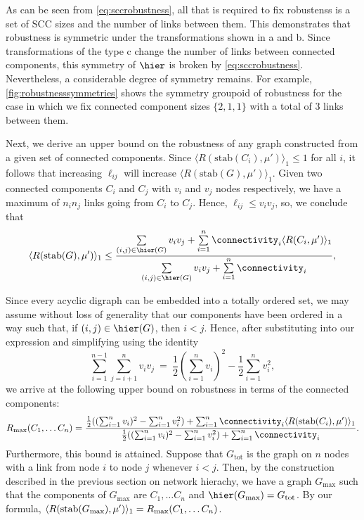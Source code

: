 As can be seen from \ref{eq:sccrobustness}, all that is required to fix robustenss is a set of SCC sizes and the number of links between them. This demonstrates that robustness is symmetric under the transformations shown in  a and b. Since transformations of the type  c change the number of links between connected components, this symmetry of $\hier$ is broken by \ref{eq:sccrobustness}. Nevertheless, a considerable degree of symmetry remains. For example, \ref{fig:robustnesssymmetries} shows the symmetry groupoid of robustness for the case in which we fix connected component sizes $\{2,1,1\}$ with a total of $3$ links between them.

Next, we derive an upper bound on the robustness of any graph
constructed from a given set of connected components.  Since
$\langle R(\textrm{stab}(C_i), \mu') \rangle_1 \le 1$ for all $i$, it follows that increasing $\ell_{ij}$ will
increase $\langle R(\textrm{stab}(G),\mu') \rangle_1$.  Given two connected components $C_i$ and $C_j$ with
$v_i$ and $v_j$ nodes respectively, we have a maximum of $n_i n_j$
links going from $C_i$ to $C_j$.  Hence, $\ell_{ij} \le v_i v_j$, so,
we conclude that
\begin{align}
\langle R(\textrm{stab}(G),\mu') \rangle_1 \le \frac{\sum\limits_{(i,j) \in \hier(G)} v_i v_j +
               \sum\limits_{i=1}^n \connectivity_i \langle R(C_i,\mu') \rangle_1}
              {\sum\limits_{(i,j) \in \hier(G)} v_i v_j +
               \sum\limits_{i=1}^n \connectivity_i},
\end{align}

Since every acyclic digraph can be embedded into a totally ordered
set, we may assume without loss of generality that our components have
been ordered in a way such that, if $(i,j) \in \hier(G)$, then $i <
j$.  Hence, after substituting into our expression and simplifying
using the identity
$$\sum_{i=1}^{n-1}\sum_{j=i+1}^{n}v_i
v_j~=~\frac{1}{2} \left( \sum_{i=1}^{n} v_i \right)^2-\frac{1}{2} \sum_{i=1}^{n}
v_i^2,$$
we arrive at the following upper bound on robustness in terms
of the connected components:
\begin{align} \label{eq:sccmaxrobustness}
R_{\mathrm{max}}(C_1, \ldots C_n) =
\frac{\frac{1}{2} ((\sum_{i=1}^n v_i)^2 - \sum_{i=1}^n v_i^2) +
                    \sum_{i=1}^n \connectivity_i \langle R(\hbox{stab}(C_i),\mu') \rangle_1}
     {\frac{1}{2} ((\sum_{i=1}^n v_i)^2 - \sum_{i=1}^n v_i^2) +
                    \sum_{i=1}^n \connectivity_i}.
\end{align}
Furthermore, this bound is attained.  Suppose that $G_{\mathrm{tot}}$
is the graph on $n$ nodes with a link from node $i$ to node $j$
whenever $i < j$.  Then, by the construction described in the previous
section on network hierachy, we have a graph $G_{\mathrm{max}}$ such
that the components of $G_{\mathrm{max}}$ are $C_1, \ldots C_n$ and
$\hier (G_{\mathrm{max}}) = G_{\mathrm{tot}}$.  By our formula,
$\langle R(\hbox{stab} (G_{\mathrm{max}}), \mu') \rangle_1 = R_{\mathrm{max}}(C_1, \ldots C_n)$.

